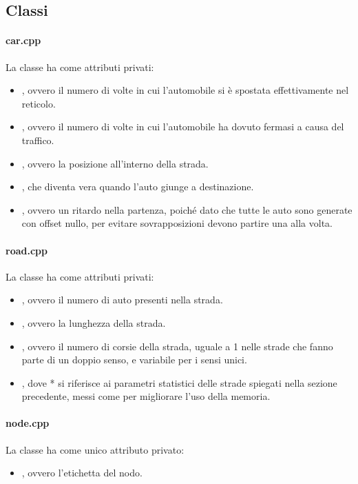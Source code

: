 \documentclass[main.tex]{subfiles}
\begin{document}
\subsection{Classi}
    \paragraph{car.cpp}
        La classe  ha come attributi privati:
        \begin{itemize}
            \item {}, ovvero il numero di volte in cui l'automobile si è spostata effettivamente nel reticolo.
            \item {}, ovvero il numero di volte in cui l'automobile ha dovuto fermasi a causa del traffico.
            \item {}, ovvero la posizione all'interno della strada.
            \item {}, che diventa vera quando l'auto giunge a destinazione.
            \item {}, ovvero un ritardo nella partenza, poiché dato che tutte le auto
                sono generate con offset nullo, per evitare sovrapposizioni devono partire una alla volta.
        \end{itemize}
    \paragraph{road.cpp}
        La classe  ha come attributi privati:
        \begin{itemize}
            \item {}, ovvero il numero di auto presenti nella strada.
            \item {}, ovvero la lunghezza della strada.
            \item {}, ovvero il numero di corsie della strada, uguale a 1 nelle strade che fanno parte di un doppio senso,
                e variabile per i sensi unici.
            \item {}, dove * si riferisce ai parametri statistici delle strade spiegati nella sezione precedente, messi come
                 per migliorare l'uso della memoria.
        \end{itemize}
    \paragraph{node.cpp}
        La classe  ha come unico attributo privato:
        \begin{itemize}
            \item {}, ovvero l'etichetta del nodo.
        \end{itemize}
\end{document}
